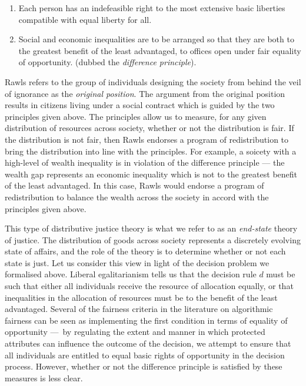 \begin{enumerate}
    \item Each person has an indefeasible right to the most extensive basic 
          liberties compatible with equal liberty for all.
    \item Social and economic inequalities are to be arranged so that they are
          both to the greatest benefit of the least advantaged, to offices
          open under fair equality of opportunity. (dubbed the
          \textit{difference principle}).
\end{enumerate}

Rawls refers to the group of individuals designing the society from behind the
veil of ignorance as the \textit{original position}. The argument from the
original position results in citizens living under a social contract which
is guided by the two principles given above. The principles allow us to measure,
for any given distribution of resources across society, whether or not the
distribution is fair. If the distribution is not fair, then Rawls endorses
a program of redistribution to bring the distribution into line with the
principles. For example, a soicety with a high-level of wealth inequality is
in violation of the difference principle — the wealth gap represents an economic
inequality which is not to the greatest benefit of the least advantaged. In this
case, Rawls would endorse a program of redistribution to balance the wealth
across the society in accord with the principles given above.

This type of distributive justice theory is what we refer to as an
\textit{end-state} theory of justice. The distribution of goods across society
represents a discretely evolving state of affairs, and the role of the theory is
to determine whether or not each state is just. Let us consider this view in
light of the decision problem we formalised above. Liberal egalitarianism tells
us that the decision rule $d$ must be such that either all individuals receive
the resource of allocation equally, or that inequalities in the allocation of
resources must be to the benefit of the least advantaged. Several of the
fairness criteria in the literature on algorithmic fairness can be seen as
implementing the first condition in terms of equality of opportunity — by 
regulating the extent and manner in which protected attributes can influence the
outcome of the decision, we attempt to ensure that all individuals are entitled
to equal basic rights of opportunity in the decision process. However, whether
or not the difference principle is satisfied by these measures is less clear.

